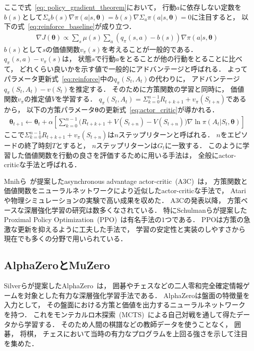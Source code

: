 ここで式~\ref{eq: policy_gradient_theorem}において， 行動$a$に依存しない定数を$b(s)$として$\Sigma_a b(s) \nabla \pi(a|s,\pmb{\theta}) = b(s) \nabla \Sigma_a \pi(a|s, \pmb{\theta}) = 0$に注目すると， 以下の式~\ref{eq:reinforce_baseline}が成り立つ．
\begin{align}
  \label{eq:reinforce_baseline}
  \nabla J(\pmb{\theta}) \propto \sum_s \mu(s) \sum_a \left(q_{\pi}(s,a) - b(s)\right) \nabla \pi(a|s, \pmb{\theta})
\end{align}
$b(s)$として$s$の価値関数$v_{\pi}(s)$を考えることが一般的である．
$q_{\pi}(s,a) - v_{\pi}(s)$は， 状態$s$で行動$a$をとることが他の行動をとることに比べて， どれくらい良いかを示す値で一般的にアドバンテージと呼ばれる．
よってパラメータ更新式~\ref{eq:reinforce}中の$q_\pi(S_t,A_t)$の代わりに， アドバンテージ$q_\pi(S_t,A_t) - v(S_t)$を推定する．
そのために方策関数の学習と同時に， 価値関数$v_\pi$の推定値$V$を学習する．
$q_\pi(S_t,A_t) = \Sigma_{k=0}^{n-1} R_{t+k+1} + v_\pi(S_{t+n})$であるから， 以下の方策パラメータ$\pmb{\theta}$の更新式~\ref{eq:actor_critic}が導かれる．
\begin{align}
  \label{eq:actor_critic}
  \pmb{\theta}_{t+1} \leftarrow \pmb{\theta}_{t} + \alpha \left[\sum_{k=0}^{n-1} \big(R_{t+k+1} + V(S_{t+n}) - V(S_{t+n})\big) \nabla \ln \pi(A_t|S_t, \pmb{\theta}) \right]
\end{align}
ここで$\Sigma_{k=0}^{n-1} R_{t+k+1} + v_\pi(S_{t+n})$は$n$ステップリターンと呼ばれる．
$n$をエピソードの終了時刻$T$とすると， $n$ステップリターンは$G_t$に一致する．
このように学習した価値関数を行動の良さを評価するために用いる手法は， 全般にactor-criticな手法と呼ばれる．

Mnihら~\cite{A3C}が提案したasynchronous advantage actor-critic~(A3C)~は， 方策関数と価値関数をニューラルネットワークにより近似したactor-criticな手法で， Atariや物理シミュレーションの実験で高い成果を収めた．
A3Cの発表以降， 方策ベースな深層強化学習の研究は数多くなされている．
特にSchulmanらが提案したProximal Policy Optimization~(PPO)~\cite{PPO}は有名手法の$1$つである．
PPOは方策の急激な更新を抑えるように工夫した手法で， 学習の安定性と実装のしやすさから現在でも多くの分野で用いられている．

\subsection{AlphaZeroとMuZero}
\label{subsec:zero}
Silverらが提案したAlphaZero~\cite{AlphaZero}は， 囲碁やチェスなどの二人零和完全確定情報ゲームを対象とした有力な深層強化学習手法である．
AlphaZeroは盤面の特徴量を入力として， その盤面における方策と価値を出力するニューラルネットワークを持つ．
これをモンテカルロ木探索~(MCTS)~による自己対戦を通して得たデータから学習する．
そのため人間の棋譜などの教師データを使うことなく， 囲碁， 将棋， チェスにおいて当時の有力なプログラムを上回る強さを示して注目を集めた．

